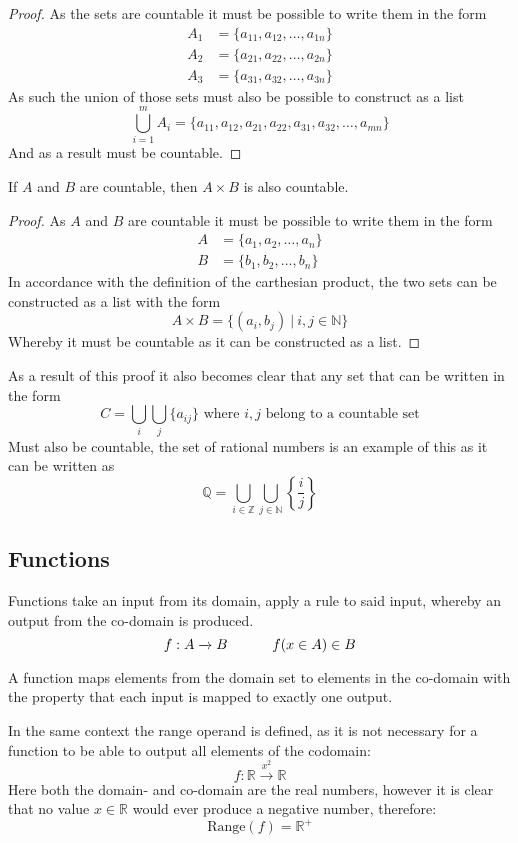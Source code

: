 \begin{proof}
  As the sets are countable it must be possible to write them in the form
  \begin{align*}
      A_1&=\{a_{11},a_{12},\ldots,a_{1n}\} \\
      A_2&=\{a_{21},a_{22},\ldots,a_{2n}\} \\
      A_3&=\{a_{31},a_{32},\ldots,a_{3n}\}
  \end{align*}
  As such the union of those sets must also be possible to construct as a list
  \[
      \bigcup_{i=1}^{m}A_{i}=\{a_{11},a_{12},a_{21},a_{22},a_{31},a_{32},\ldots,a_{mn}\}
  \]
  And as a result must be countable.
\end{proof}
\begin{theorem}
  If $A$ and $B$ are countable, then $A\times B$ is also countable.
\end{theorem}
\begin{proof}
  As $A$ and $B$ are countable it must be possible to write them in the form
  \begin{align*}
      A&=\{a_{1},a_{2},\ldots,a_{n}\} \\
      B&=\{b_{1},b_{2},\ldots,b_{n}\}
  \end{align*}
  In accordance with the definition of the carthesian product, the two sets can be constructed as a list with the form
  \[
      A\times B=\{(a_{i},b_{j})~|~i,j\in \mathbb{N}\}
  \]
  Whereby it must be countable as it can be constructed as a list.
\end{proof}
As a result of this proof it also becomes clear that any set that can be written in the form
\[
    C=\bigcup_{i}\bigcup_{j}\{a_{ij}\}\text{ where }i,j \text{ belong to a countable set}
\]
Must also be countable, the set of rational numbers is an example of this as it can be written as
\[
    \mathbb{Q}=\bigcup_{i\in \mathbb{Z}}\bigcup_{j\in \mathbb{N}}\left\{\frac{i}{j}\right\}
\]
\subsection{Functions}
Functions take an input from its domain, apply a rule to said input, whereby an output from the co-domain is produced.
\[
    f:A\xrightarrow{} B\hskip 32pt f(x\in A)\in B
\]
\begin{definition}
  A function maps elements from the domain set to elements in the co-domain with the property that each input is mapped to exactly one output.
\end{definition}
In the same context the range operand is defined, as it is not necessary for a function to be able to output all elements of the codomain:
\[
    f: \mathbb{R} \xrightarrow{x^{2}} \mathbb{R}
\]
Here both the domain- and co-domain are the real numbers, however it is clear that no value $x\in \mathbb{R}$ would ever produce a negative number, therefore:
\[
    \text{Range}(f)=\mathbb{R}^{+}
\]
